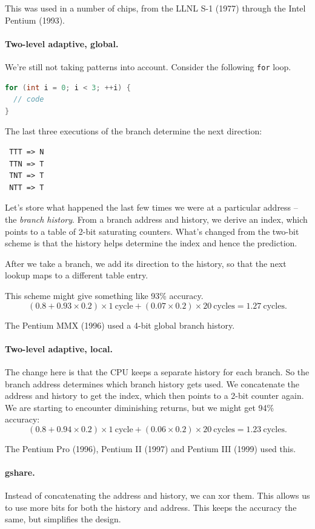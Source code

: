 This was used in a number of chips, from the LLNL S-1 (1977) through the Intel Pentium (1993).

\paragraph{Two-level adaptive, global.}
We're still not taking patterns into account. Consider the following {\tt for} loop.
\begin{lstlisting}[language=C]
for (int i = 0; i < 3; ++i) {
  // code
}
\end{lstlisting}
The last three executions of the branch determine the next direction:
\begin{verbatim}
 TTT => N
 TTN => T
 TNT => T
 NTT => T
\end{verbatim}
Let's store what happened the last few times we were at a particular address -- the
\emph{branch history}. From a branch address and history, we derive an index, which
points to a table of 2-bit saturating counters. What's changed from the two-bit scheme
is that the history helps determine the index and hence the prediction.

After we take a branch, we add its direction to the history, so that the next lookup
maps to a different table entry.

This scheme might give something like 93\% accuracy.
\[
(0.8 + 0.93 \times 0.2) \times 1 \mathrm{~cycle} + (0.07 \times 0.2) \times 20 \mathrm{~cycles} = 1.27 \mathrm{~cycles}.
\]

The Pentium MMX (1996) used a 4-bit global branch history.

\paragraph{Two-level adaptive, local.}
The change here is that the CPU keeps a separate history for each branch.
So the branch address determines which branch history gets used.
We concatenate the address and history to get the index, which then points to a
2-bit counter again. We are starting to encounter diminishing returns, but we might
get 94\% accuracy:
\[
(0.8 + 0.94 \times 0.2) \times 1 \mathrm{~cycle} + (0.06 \times 0.2) \times 20 \mathrm{~cycles} = 1.23 \mathrm{~cycles}.
\]

The Pentium Pro (1996), Pentium II (1997) and Pentium III (1999) used this.

\paragraph{gshare.}
Instead of concatenating the address and history, we can xor them. This allows
us to use more bits for both the history and address. This keeps the accuracy the same,
but simplifies the design.


